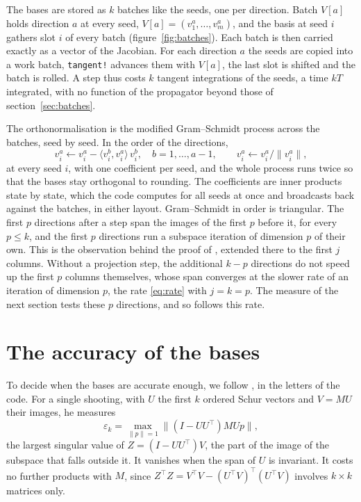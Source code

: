 \documentclass[11pt,a4paper]{article}
\newcommand{\ip}[2]{\langle #1, #2\rangle}
\newcommand{\code}[1]{\texttt{#1}}
\begin{document}
The bases are stored as $k$ batches like the seeds, one per direction. Batch $V[a]$ holds
direction $a$ at every seed, $V[a] = (v_1^a, \dots, v_m^a)$, and the basis at seed $i$ gathers
slot $i$ of every batch (figure~\ref{fig:batches}). Each batch is then carried exactly as a vector
of the Jacobian. For each direction $a$ the seeds are copied into a work batch,
\code{tangent!} advances them with $V[a]$, the last slot is shifted and the batch is rolled. A step
thus costs $k$ tangent integrations of the seeds, a time $kT$ integrated, with no function of the
propagator beyond those of section~\ref{sec:batches}.

The orthonormalisation is the modified Gram--Schmidt process across the batches, seed by seed. In
the order of the directions,
\begin{equation}
  v_i^a \leftarrow v_i^a - \ip{v_i^b}{v_i^a}\, v_i^b, \quad b = 1, \dots, a - 1, \qquad
  v_i^a \leftarrow v_i^a / \|v_i^a\|,
\end{equation}
at every seed $i$, with one coefficient per seed, and the whole process runs twice so that the
bases stay orthogonal to rounding. The coefficients are inner products state by state, which the
code computes for all seeds at once and broadcasts back against the batches, in either layout.
Gram--Schmidt in order is triangular. The first $p$ directions after a step span the images of the
first $p$ before it, for every $p \leq k$, and the first $p$ directions run a subspace iteration of
dimension $p$ of their own. This is the observation behind the proof of \citet[theorem
5.1]{saad2011}, extended there to the first $j$ columns. Without a projection step, the additional
$k - p$ directions do not speed up the first $p$ columns themselves, whose span converges at the
slower rate of an iteration of dimension $p$, the rate \eqref{eq:rate} with $j = k = p$. The
measure of the next section tests these $p$ directions, and so follows this rate.

\section{The accuracy of the bases}
\label{sec:accuracy}

To decide when the bases are accurate enough, we follow \citet[sections 2.4.4 and
6.3.3]{lust1997}, in the letters of the code. For a single shooting, with $U$ the first $k$ ordered
Schur vectors and $V = MU$ their images, he measures
\begin{equation}
  \varepsilon_k = \max_{\|p\| = 1} \big\| (I - UU^{\!\top}) M U p \big\| ,
\end{equation}
the largest singular value of $Z = (I - UU^{\!\top}) V$, the part of the image of the subspace that
falls outside it. It vanishes when the span of $U$ is invariant. It costs no further products with
$M$, since $Z^{\!\top} Z = V^{\!\top} V - (U^{\!\top} V)^{\!\top} (U^{\!\top} V)$ involves $k \times k$
matrices only.
\end{document}
